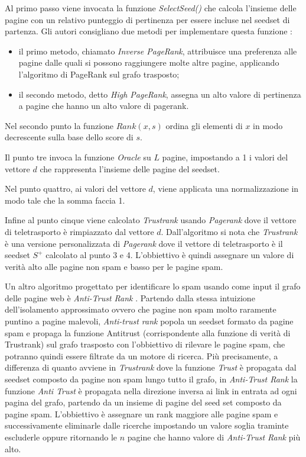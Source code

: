 Al primo passo viene invocata la funzione \textit{SelectSeed()} che calcola l'insieme delle pagine con un relativo punteggio di pertinenza per essere incluse nel seedset di partenza. Gli autori consigliano due metodi per implementare questa funzione : 
\begin{itemize}
 \item il primo metodo, chiamato \textit{Inverse PageRank}, attribuisce una preferenza alle pagine dalle quali si possono raggiungere molte altre pagine,  applicando l'algoritmo di PageRank sul grafo trasposto;
\item il secondo metodo, detto \textit{High PageRank}, assegna un alto valore di pertinenza a pagine che hanno un alto valore di pagerank.
\end{itemize}

Nel secondo punto  la funzione \(Rank(x,s)\) ordina gli elementi di \(x\) in modo decrescente sulla base dello score di \(s\). 

Il punto tre invoca la funzione \textit{Oracle} su \(L\) pagine, impostando a 1 i valori del vettore \(d\) che rappresenta l'insieme delle pagine del seedset.

Nel punto quattro, ai valori del vettore \(d\), viene applicata una normalizzazione in modo tale che la somma faccia 1. 

Infine al punto cinque viene calcolato \textit{Trustrank} usando \textit{Pagerank} dove il vettore di teletrasporto è rimpiazzato dal vettore \(d\). Dall'algoritmo si nota che \textit{Trustrank} è una versione personalizzata di \textit{Pagerank} dove il vettore di teletrasporto è il seedset \(S^+\) calcolato al punto 3 e 4. L'obbiettivo è quindi assegnare un valore di verità alto alle pagine non spam e basso per le pagine spam.


Un altro algoritmo progettato per identificare lo spam usando come input il grafo delle pagine web è \textit{Anti-Trust Rank} \cite{Krishnan06webspam}. Partendo dalla stessa intuizione dell'isolamento approssimato ovvero che pagine non spam molto raramente puntino a pagine malevoli, \textit{Anti-trust rank}  popola un seedset formato da pagine spam e propaga la funzione Antitrust (corrispondente alla funzione di verità di Trustrank) sul grafo trasposto con l’obbiettivo di rilevare le pagine spam, che potranno quindi essere filtrate da un motore di ricerca. Più precisamente, a differenza di quanto avviene in \textit{Trustrank} dove la funzione \textit{Trust} è propagata dal seedset composto da pagine non spam lungo tutto il grafo, in \textit{Anti-Trust Rank} la funzione \textit{Anti Trust} è propagata nella direzione inversa ai link in entrata ad ogni pagina del grafo, partendo da un insieme di pagine del seed set composto da pagine spam. L'obbiettivo è assegnare un rank maggiore alle pagine spam e 
successivamente eliminarle dalle ricerche impostando un valore soglia traminte escluderle oppure ritornando le \(n\) pagine che hanno valore di \textit{Anti-Trust Rank} più alto.
 
